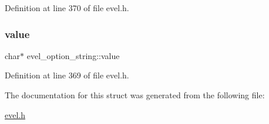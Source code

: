 Definition at line 370 of file evel.\+h.

\hypertarget{structevel__option__string_a2e2900a5517b8ec07a6440413bdcb37a}{}\label{structevel__option__string_a2e2900a5517b8ec07a6440413bdcb37a} 
\subsubsection{\texorpdfstring{value}{value}}
{\footnotesize\ttfamily char$\ast$ evel\+\_\+option\+\_\+string\+::value}



Definition at line 369 of file evel.\+h.



The documentation for this struct was generated from the following file\+:\begin{DoxyCompactItemize}
\item 
\hyperlink{evel_8h}{evel.\+h}\end{DoxyCompactItemize}
